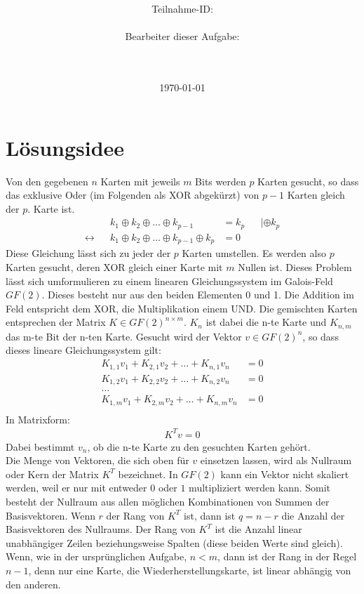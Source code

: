 \documentclass[a4paper,10pt,ngerman]{scrartcl}
\title{\textbf{\Huge\Aufgabe}}
\author{\LARGE Teilnahme-ID: \LARGE \TeamId \\\\
	    \LARGE Bearbeiter dieser Aufgabe: \\ 
	    \LARGE \Namen\\\\}
\date{\LARGE\today}
\newcommand*\xor{\oplus}
\begin{document}
\maketitle
\tableofcontents

\vspace{0.5cm}



\section{Lösungsidee}
Von den gegebenen $n$ Karten mit jeweils $m$ Bits werden $p$ Karten gesucht, so dass das exklusive Oder (im Folgenden als XOR abgekürzt) von $p-1$ Karten gleich der $p.$ Karte ist.
\begin{align*}
&& k_1 \xor k_2 \xor \ldots \xor k_{p-1} &= k_p && |\xor k_p \\
\leftrightarrow && k_1 \xor k_2 \xor \ldots \xor k_{p-1} \xor k_p &= 0 &&
\end{align*}
Diese Gleichung lässt sich zu jeder der $p$ Karten umstellen. Es werden also $p$ Karten gesucht, deren XOR gleich einer Karte mit $m$ Nullen ist. Dieses Problem lässt sich umformulieren zu einem linearen Gleichungssystem im Galois-Feld $GF(2)$. Dieses besteht nur aus den beiden Elementen 0 und 1. Die Addition im Feld entspricht dem XOR, die Multiplikation einem UND. Die gemischten Karten entsprechen der Matrix $K \in GF(2)^{n \times m}$. $K_n$ ist dabei die n-te Karte und $K_{n,m}$ das m-te Bit der n-ten Karte. Gesucht wird der Vektor $v \in GF(2)^n$, so dass dieses lineare Gleichungssystem gilt:
\begin{align*}
K_{1, 1} v_1 + K_{2, 1} v_2 + \ldots + K_{n, 1} v_n &= 0 \\
K_{1, 2} v_1 + K_{2, 2} v_2 + \ldots + K_{n, 2} v_n &= 0 \\
\ldots \\
K_{1, m} v_1 + K_{2, m} v_2 + \ldots + K_{n, m} v_n &= 0 \\ 
\end{align*}
In Matrixform:
\begin{align*}
K^T v = 0
\end{align*}
Dabei bestimmt $v_n$, ob die n-te Karte zu den gesuchten Karten gehört. \\
Die Menge von Vektoren, die sich oben für $v$ einsetzen lassen, wird als Nullraum oder Kern der Matrix $K^T$ bezeichnet. In $GF(2)$ kann ein Vektor nicht skaliert werden, weil er nur mit entweder $0$ oder $1$ multipliziert werden kann. Somit besteht der Nullraum aus allen möglichen Kombinationen von Summen der Basisvektoren. Wenn $r$ der Rang von $K^T$ ist, dann ist $q=n-r$ die Anzahl der Basisvektoren des Nullraums. Der Rang von $K^T$ ist die Anzahl linear unabhängiger Zeilen beziehungsweise Spalten (diese beiden Werte sind gleich). Wenn, wie in der ursprünglichen Aufgabe, $n<m$, dann ist der Rang in der Regel $n-1$, denn nur eine Karte, die Wiederherstellungskarte, ist linear abhängig von den anderen. \\
\end{document}
